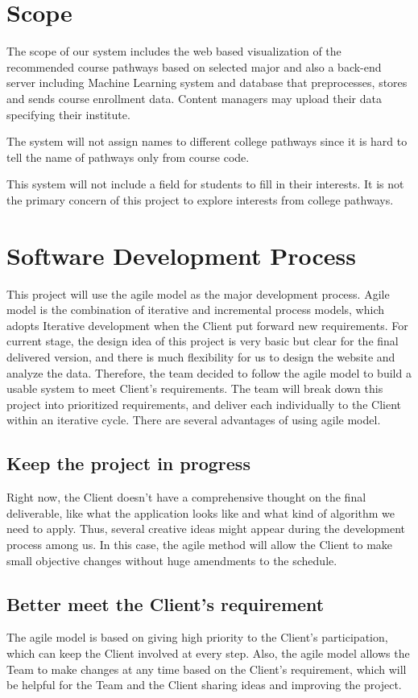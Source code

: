 \documentclass{article}
\begin{document}
\section{Scope}
The scope of our system includes the web based visualization of the recommended course pathways based on selected major and also a back-end server including Machine Learning system and database that preprocesses, stores and sends course enrollment data. Content managers may upload their data specifying their institute.

\vspace{0.4cm}The system will not assign names to different college pathways since it is hard to tell the name of pathways only from course code.

\vspace{0.4cm}This system will not include a field for students to fill in their interests. It is not the primary concern of this project to explore interests from college pathways.

\section{Software Development Process}
This project will use the agile model as the major development process. Agile model is the combination of iterative and incremental process models, which adopts Iterative development when the Client put forward new requirements. For current stage, the design idea of this project is very basic but clear for the final delivered version, and there is much flexibility for us to design the website and analyze the data. Therefore, the team decided to follow the agile model to build a usable system to meet Client’s requirements. The team will break down this project into prioritized requirements, and deliver each individually to the Client within an iterative cycle. There are several advantages of using agile model.
\subsection{Keep the project in progress}
Right now, the Client doesn’t have a comprehensive thought on the final deliverable, like what the application looks like and what kind of algorithm we need to apply.  Thus, several creative ideas might appear during the development process among us.  In this case, the agile method will allow the Client to make small objective changes without huge amendments to the schedule. 

\subsection{Better meet the Client’s requirement}
The agile model is based on giving high priority to the Client’s participation, which can keep the Client involved at every step. Also, the agile model allows the Team to make changes at any time based on the Client’s requirement, which will be helpful for the Team and the Client sharing ideas and improving the project. 
\end{document}
